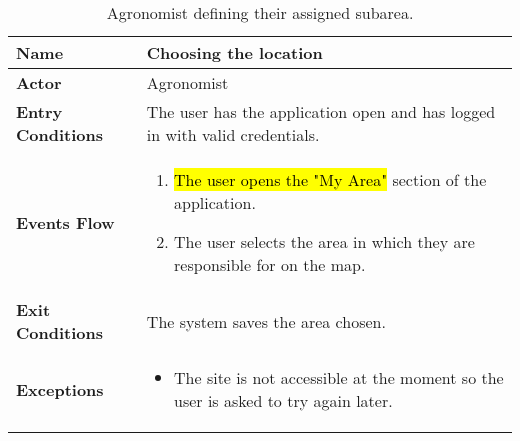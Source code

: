 
\begin{table}[hbt!]
\centering
\small
\caption{\label{tab:agrLocation}Agronomist defining their assigned subarea.}

\renewcommand{\arraystretch}{1.25}
\begin{tabular}{|l|>{\raggedright\arraybackslash}m{12cm}|}

    \hline
    \textbf{Name} & Choosing the location\\
    \hline
   	\textbf{Actor} & Agronomist\\
    \hline
    \textbf{Entry Conditions} & The user has the application open and has logged in with valid credentials.\\
    \hline
    \textbf{Events Flow} & \begin{enumerate}
            \item \hl{The user opens the "My Area"} section of the application.
            \item The user selects the area in which they are responsible for on the map.
       \end{enumerate}\\
    \hline
    \textbf{Exit Conditions} & The system saves the area chosen.\\
    \hline
    \textbf{Exceptions} & 
        \begin{itemize}
          \item The site is not accessible at the moment so the user is asked to try again later.
        \end{itemize}
     \\
    \hline
\end{tabular}
\end{table}